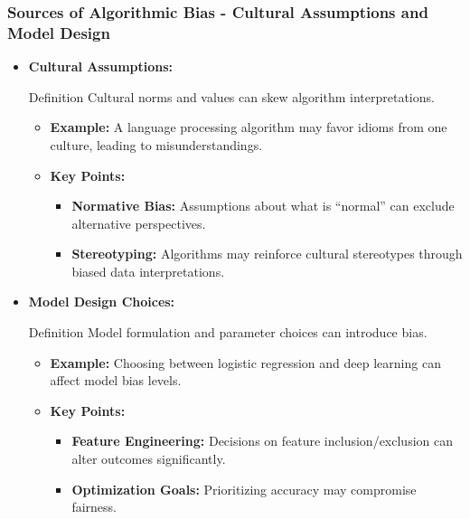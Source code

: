 \documentclass{beamer}
\begin{document}
\begin{frame}[fragile]
    \frametitle{Sources of Algorithmic Bias - Cultural Assumptions and Model Design}
    \begin{itemize}
        \item \textbf{Cultural Assumptions:}
        \begin{block}{Definition}
        Cultural norms and values can skew algorithm interpretations.
        \end{block}
        \begin{itemize}
            \item \textbf{Example:} A language processing algorithm may favor idioms from one culture, leading to misunderstandings.
            \item \textbf{Key Points:}
            \begin{itemize}
                \item \textbf{Normative Bias:} Assumptions about what is “normal” can exclude alternative perspectives.
                \item \textbf{Stereotyping:} Algorithms may reinforce cultural stereotypes through biased data interpretations.
            \end{itemize}
        \end{itemize}
        
        \item \textbf{Model Design Choices:}
        \begin{block}{Definition}
        Model formulation and parameter choices can introduce bias.
        \end{block}
        \begin{itemize}
            \item \textbf{Example:} Choosing between logistic regression and deep learning can affect model bias levels.
            \item \textbf{Key Points:}
            \begin{itemize}
                \item \textbf{Feature Engineering:} Decisions on feature inclusion/exclusion can alter outcomes significantly.
                \item \textbf{Optimization Goals:} Prioritizing accuracy may compromise fairness.
            \end{itemize}
        \end{itemize}
    \end{itemize}
\end{frame}
\end{document}
